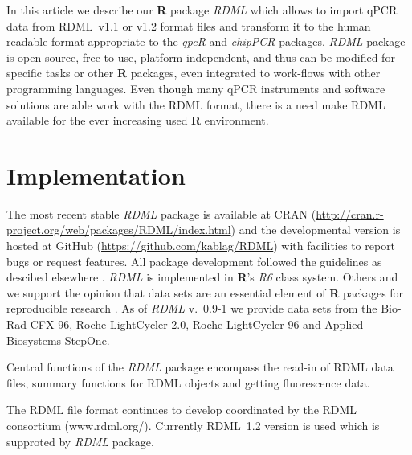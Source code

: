\documentclass{bioinfo}
\begin{document}
In this article we describe our \textbf{R} package \textit{RDML} which allows to 
import qPCR data from RDML~v1.1 or v1.2 format files and transform it to the human 
readable format appropriate to the \textit{qpcR} and \textit{chipPCR} packages. 
\textit{RDML} package is open-source, free to use, platform-independent, and 
thus can be modified for specific tasks or other \textbf{R} packages, even 
integrated to work-flows with other programming languages. Even though many qPCR 
instruments and software solutions are able work with the RDML format, there is 
a need make RDML available for the ever increasing used \textbf{R} environment.

\section{Implementation}

The most recent stable \textit{RDML} package is available at CRAN 
(\url{http://cran.r-project.org/web/packages/RDML/index.html}) and the 
developmental version is hosted at GitHub (\url{https://github.com/kablag/RDML}) 
with facilities to report bugs or request features. All package development 
followed the guidelines as descibed elsewhere \cite{RDCT2014a}. \textit{RDML} is 
implemented in \textbf{R}’s \emph{R6} class system. Others and we 
support the opinion that data sets are an essential element of \textbf{R} 
packages for reproducible research 
\cite{gentleman_2004,hofmann_2013,Leeper_2014}. As 
of \textit{RDML} v.~0.9-1 we provide data sets from the Bio-Rad CFX 96, Roche 
LightCycler 2.0, Roche LightCycler 96 and Applied Biosystems StepOne.

Central functions of the \textit{RDML} package encompass the read-in of RDML 
data files, summary functions for RDML objects and getting fluorescence data.

The RDML file format continues to develop coordinated by the RDML consortium 
(www.rdml.org/). Currently RDML~1.2 version is used which is supproted by \textit{RDML} package.
\end{document}
